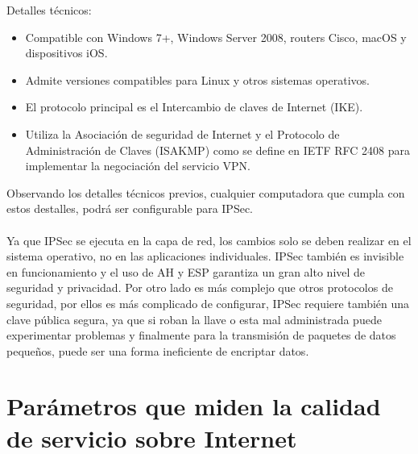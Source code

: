 \documentclass[a4paper,12pt]{article}
\begin{document}
Detalles técnicos:

\begin{itemize}
    \item Compatible con Windows 7+, Windows Server 2008, routers Cisco, macOS y dispositivos iOS.
    \item Admite versiones compatibles para Linux y otros sistemas operativos.
    \item El protocolo principal es el Intercambio de claves de Internet (IKE).
    \item Utiliza la Asociación de seguridad de Internet y el Protocolo de Administración de Claves (ISAKMP) como se define en IETF RFC 2408 para implementar la negociación del servicio VPN.
\end{itemize}

Observando los detalles técnicos previos, cualquier computadora que cumpla con estos destalles, podrá ser configurable para IPSec.
\\
\\
Ya que IPSec se ejecuta en la capa de red, los cambios solo se deben realizar en el sistema operativo, no en las aplicaciones individuales. IPSec también es invisible en funcionamiento y el uso de AH y ESP garantiza un gran alto nivel de seguridad y privacidad. Por otro lado es más complejo que otros protocolos de seguridad, por ellos es más complicado de configurar, IPSec requiere también una clave pública segura, ya que si roban la llave o esta mal administrada puede experimentar problemas y finalmente para la transmisión de paquetes de datos pequeños, puede ser una forma ineficiente de encriptar datos.

\clearpage
\newpage

\section{Parámetros que miden la calidad de servicio sobre Internet}
\end{document}
